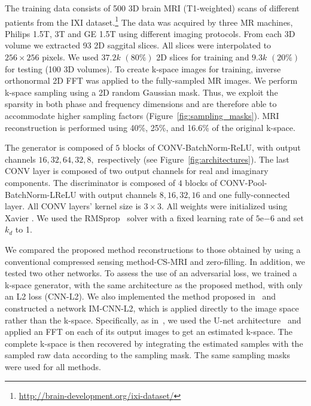\documentclass[10pt,journal,compsoc]{IEEEtran}
\begin{document}
The training data consists of 500 3D brain MRI (T1-weighted) scans of different patients from the IXI dataset.\footnote{\url{http://brain-development.org/ixi-dataset/}} The data was acquired by three MR machines, Philips 1.5T, 3T and GE 1.5T using different imaging protocols.
From each 3D volume we extracted 93 2D saggital slices. All slices were interpolated to $256\times256$ pixels. We used $37.2k$ $(80\%)$ 2D slices for training and $9.3k$ $(20\%)$ for testing (100 3D volumes).
To create k-space images for training, inverse orthonormal
2D FFT was applied to the fully-sampled MR images. 
We perform k-space sampling using a 2D random Gaussian mask. Thus, we exploit the sparsity in both phase and frequency dimensions and are therefore able to accommodate higher sampling factors (Figure~\ref{fig:sampling_masks}). MRI reconstruction is performed using 40\%, 25\%, and 16.6\% of the original k-space.

The generator is composed of $5$ blocks of CONV-BatchNorm-ReLU, with output channels $16,32,64,32,8,$ respectively (see Figure~\ref{fig:architectures}). The last CONV layer is composed of two output channels for real and imaginary components. The discriminator is composed of $4$ blocks of CONV-Pool-BatchNorm-LReLU with output channels $8,16,32,16$ and one fully-connected layer. All CONV layers' kernel size is $3\times3$. All weights were initialized using Xavier \cite{glorot2010understanding}. We used the RMSprop~\cite{tieleman2012lecture} solver with a fixed learning rate of $5\mathrm{e}{-6}$ and set $k_{d}$ to 1.

We compared the proposed method reconstructions to those obtained by using a conventional compressed sensing method-CS-MRI \cite{lustig2007sparse} and zero-filling. In addition, we tested two other networks. To assess the use of an adversarial loss, we trained a k-space generator, with the same architecture as the proposed method, with only an L2 loss (CNN-L2). We also implemented the method proposed in~\cite{hyun2017deep} and constructed a network IM-CNN-L2, which is applied directly to the image space rather than the k-space. Specifically, as in~\cite{hyun2017deep}, we used the U-net architecture~\cite{ronneberger2015u} and applied an FFT on each of its output images to get an estimated k-space. The complete k-space is then recovered by integrating the estimated samples with the sampled raw data according to the sampling mask. The same sampling masks were used for all methods.
\end{document}
